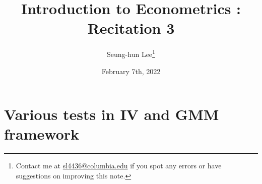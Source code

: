 \documentclass[12pt]{article}
\title{Introduction to Econometrics \ROM{2}: Recitation 3}
\theoremstyle{definition}
\theoremstyle{property}
\theoremstyle{assumption}
\theoremstyle{example}
\theoremstyle{comment}
\newtheorem{comment}{Comment}[section]
\begin{document}
\linespread{1.25}
\onehalfspacing

\author{Seung-hun Lee\footnote{Contact me at \href{mailto:sl4436@columbia.edu}{sl4436@columbia.edu} if you spot any errors or have suggestions on improving this note.}}
\date{February 7th, 2022}
\maketitle
\thispagestyle{firstpage}

\section{Various tests in IV and GMM framework}
\begin{mdframed}[backgroundcolor=yellow!5] 

\end{mdframed}
\end{document}
